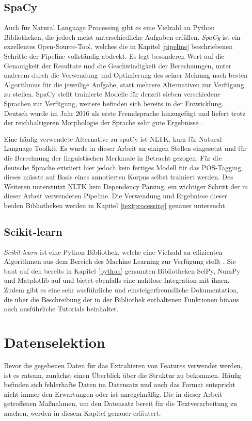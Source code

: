 \subsection{SpaCy}
Auch für Natural Language Processing gibt es eine Vielzahl an Python Bibliotheken, die jedoch meist unterschiedliche Aufgaben erfüllen. \emph{SpaCy} ist ein exzellentes Open-Source-Tool, welches die in Kapitel \ref{pipeline} beschriebenen Schritte der Pipeline vollständig abdeckt. Es legt besonderen Wert auf die Genauigkeit der Resultate und die Geschwindigkeit der Berechnungen, unter anderem durch die Verwendung und Optimierung des seiner Meinung nach besten Algorithmus für die jeweilige Aufgabe, statt mehrere Alternativen zur Verfügung zu stellen. SpaCy stellt trainierte Modelle für derzeit sieben verschiedene Sprachen zur Verfügung, weitere befinden sich bereits in der Entwicklung. Deutsch wurde im Jahr 2016 als erste Fremdsprache hinzugefügt und liefert trotz der reichhaltigeren Morphologie der Sprache sehr gute Ergebnisse \cite{spacyGerman}.

Eine häufig verwendete Alternative zu spaCy ist NLTK, kurz für Natural Language Toolkit. Es wurde in dieser Arbeit an einigen Stellen eingesetzt und für die Berechnung der linguistischen Merkmale in Betracht gezogen. Für die deutsche Sprache existiert hier jedoch kein fertiges Modell für das POS-Tagging, dieses müsste auf Basis eines annotierten Korpus selbst trainiert werden. Des Weiteren unterstützt NLTK kein Dependency Parsing, ein wichtiger Schritt der in dieser Arbeit verwendeten Pipeline. Die Verwendung und Ergebnisse dieser beiden Bibliotheken werden in Kapitel \ref{textprocessing} genauer untersucht.

\subsection{Scikit-learn}
\emph{Scikit-learn} ist eine Python Bibliothek, welche eine Vielzahl an effizienten Algorithmen aus dem Bereich des Machine Learning zur Verfügung stellt \cite{scikit-learn}. Sie baut auf den bereits in Kapitel \ref{python} genannten Bibliotheken SciPy, NumPy und Matplotlib auf und bietet ebenfalls eine nahtlose Integration mit ihnen. Zudem gibt es eine sehr ausführliche und einsteigerfreundliche Dokumentation, die über die Beschreibung der in der Bibliothek enthaltenen Funktionen hinaus auch ausführliche Tutorials beinhaltet.

\section{Datenselektion}
Bevor die gegebenen Daten für das Extrahieren von Features verwendet werden, ist es ratsam, zunächst einen Überblick über die Struktur zu bekommen. Häufig befinden sich fehlerhafte Daten im Datensatz und auch das Format entspricht nicht immer den Erwartungen oder ist unregelmäßig. Die in dieser Arbeit getroffenen Maßnahmen, um den Datensatz bereit für die Textverarbeitung zu machen, werden in diesem Kapitel genauer erläutert.

